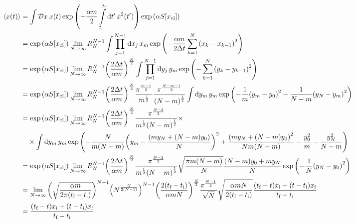 \documentclass[twoside]{amsart}
\newcommand{\Dd}[1]{\mathcal D #1\: }
\numberwithin{equation}{section}
\begin{document}
\begin{align*}
    \expval{x\qty(t)}&=\int\Dd xx\qty(t)\exp\qty(-\frac{\alpha m}{2}\int\limits_{t_{\textnormal i}}^{t_{\textnormal f}}\dd{t'}\dot x^2\qty(t'))\exp\qty(\alpha S\qty[x_{\textnormal{cl}}])\\
    &=\exp\qty(\alpha S\qty[x_{\textnormal{cl}}])\lim\limits_{N\rightarrow\infty}R_N^{N-1}\int\prod\limits_{j=1}^{N-1}\dd{x_j}x_m\exp\qty(-\frac{\alpha m}{2\Delta t}\sum\limits_{k=1}^N\qty(x_k-x_{k-1})^2)\\
    &=\exp\qty(\alpha S\qty[x_{\textnormal{cl}}])\lim\limits_{N\rightarrow\infty}R_N^{N-1}\qty(\frac{2\Delta t}{\alpha m})^{\frac N2}\int\prod\limits_{j=1}^{N-1}\dd{y_j}y_m\exp\qty(-\sum\limits_{k=1}^N\qty(y_k-y_{k-1})^2)\\
    &=\exp\qty(\alpha S\qty[x_{\textnormal{cl}}])\lim\limits_{N\rightarrow\infty}R_N^{N-1}\qty(\frac{2\Delta t}{\alpha m})^{\frac N2}\frac{\pi^{\frac{m-1}{2}}}{m^{\frac12}}\frac{\pi^{\frac{N-m-1}{2}}}{\qty(N-m)^{\frac12}}\int\dd{y_m}y_m\exp\qty(-\frac{1}{m}\qty(y_m-y_0)^2-\frac{1}{N-m}\qty(y_N-y_m)^2)\\
    &=\exp\qty(\alpha S\qty[x_{\textnormal{cl}}])\lim\limits_{N\rightarrow\infty}R_N^{N-1}\qty(\frac{2\Delta t}{\alpha m})^{\frac N2}\frac{\pi^{\frac{N-2}{2}}}{m^{\frac12}\qty(N-m)^{\frac12}}\times\\
    &\quad\times\int\dd{y_m}y_m\exp\qty(-\frac{N}{m\qty(N-m)}\qty(y_m-\frac{\qty(my_N+\qty(N-m)y_0)}{N})^2+\frac{\qty(my_N+\qty(N-m)y_0)^2}{Nm\qty(N-m)}-\frac{y_0^2}{m}-\frac{y_N^2}{N-m})\\
    &=\exp\qty(\alpha S\qty[x_{\textnormal{cl}}])\lim\limits_{N\rightarrow\infty}R_N^{N-1}\qty(\frac{2\Delta t}{\alpha m})^{\frac N2}\frac{\pi^{\frac{N-2}{2}}}{m^{\frac12}\qty(N-m)^{\frac12}}\sqrt{\frac{\pi m\qty(N-m)}{N}}\frac{\qty(N-m)y_0+my_N}{N}\exp\qty(-\frac1N\qty(y_N-y_0)^2)\\
    &=\lim\limits_{N\rightarrow\infty}\qty(\sqrt{\frac{\alpha m}{2\pi\qty(t_{\textnormal f}-t_{\textnormal i})}})^{N-1}\qty(N^{\frac{N}{2\qty(N-1)}})^{N-1}\qty(\frac{2\qty(t_{\textnormal f}-t_{\textnormal i})}{\alpha mN})^{\frac N2}\frac{\pi^{\frac{N-1}{2}}}{\sqrt N}\sqrt{\frac{\alpha m N}{2\qty(t_{\textnormal f}-t_{\textnormal i})}}\frac{\qty(t_{\textnormal f}-t)x_{\textnormal i}+\qty(t-t_{\textnormal i})x_{\textnormal f}}{t_{\textnormal f}-t_{\textnormal i}}\\
    &=\frac{\qty(t_{\textnormal f}-t)x_{\textnormal i}+\qty(t-t_{\textnormal i})x_{\textnormal f}}{t_{\textnormal f}-t_{\textnormal i}}
\end{align*}
\end{document}
